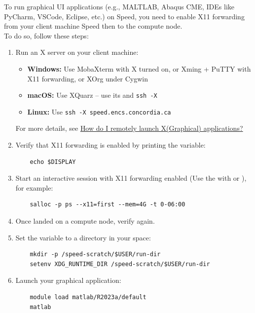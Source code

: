 To run graphical UI applications (e.g., MALTLAB, Abaqus CME, IDEs like PyCharm, VSCode, Eclipse, etc.) on Speed,
you need to enable X11 forwarding from your client machine Speed then to the compute node.\\
To do so, follow these steps:
\begin{enumerate}
\item Run an X server on your client machine:
\begin{itemize}
    \item \textbf{Windows:} Use MobaXterm with X turned on, or Xming + PuTTY with X11 forwarding, or XOrg under Cygwin
    \item \textbf{macOS:} Use XQuarz -- use its  and \texttt{ssh -X}
    \item \textbf{Linux:} Use \texttt{ssh -X speed.encs.concordia.ca}
\end{itemize}
For more details, see \href{https://www.concordia.ca/ginacody/aits/support/faq/xserver.html}{How do I remotely launch X(Graphical) applications?}

\item Verify that X11 forwarding is enabled by printing the  variable:
\begin{verbatim}
    echo $DISPLAY
\end{verbatim}

\item Start an interactive session with X11 forwarding enabled (Use the  with  or ), for example:
\begin{verbatim}
    salloc -p ps --x11=first --mem=4G -t 0-06:00
\end{verbatim}

\item Once landed on a compute node, verify  again.

\item Set the  variable to a directory in your  space:
\begin{verbatim}
    mkdir -p /speed-scratch/$USER/run-dir
    setenv XDG_RUNTIME_DIR /speed-scratch/$USER/run-dir
\end{verbatim}

\item Launch your graphical application:
\begin{verbatim}
    module load matlab/R2023a/default
    matlab
\end{verbatim}
\end{enumerate}

